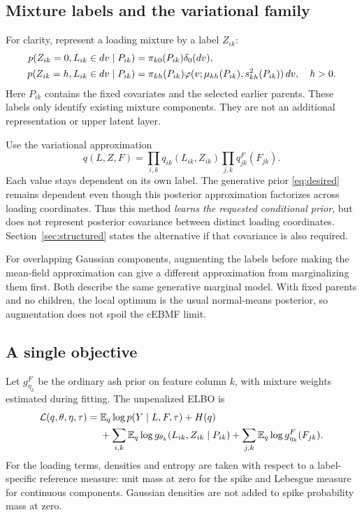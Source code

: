 \documentclass[11pt,a4paper]{article}
\newcommand{\E}{\mathbb E}
\newcommand{\LL}{\mathcal L}
\newcommand{\Normal}[3]{\varphi(#1;#2,#3)}
\begin{document}
\subsection{Mixture labels and the variational family}
For clarity, represent a loading mixture by a label \(Z_{ik}\):
\begin{align}
p(Z_{ik}=0,L_{ik}\in dv\mid P_{ik})
  &=\pi_{k0}(P_{ik})\delta_0(dv),\notag\\
p(Z_{ik}=h,L_{ik}\in dv\mid P_{ik})
  &=\pi_{kh}(P_{ik})\Normal{v}{\mu_{kh}(P_{ik})}{s_{kh}^2(P_{ik})}\,dv,
  \quad h>0.
\label{eq:mixture}
\end{align}
Here \(P_{ik}\) contains the fixed covariates and the selected earlier
parents. These labels only identify existing mixture components. They
are not an additional representation or upper latent layer.

Use the variational approximation
\begin{equation}
q(L,Z,F)=\prod_{i,k}q_{ik}(L_{ik},Z_{ik})\prod_{j,k}q^F_{jk}(F_{jk}).
\label{eq:q}
\end{equation}
Each value stays dependent on its own label. The generative prior
\eqref{eq:desired} remains dependent even though this posterior
approximation factorizes across loading coordinates. Thus this method
\emph{learns the requested conditional prior}, but does not represent
posterior covariance between distinct loading coordinates. Section~\ref{sec:structured}
states the alternative if that covariance is also required.

For overlapping Gaussian components, augmenting the labels before making
the mean-field approximation can give a different approximation from
marginalizing them first. Both describe the same generative marginal model.
With fixed parents and no children, the local optimum is the usual
normal-means posterior, so augmentation does not spoil the cEBMF limit.

\subsection{A single objective}
Let \(g^F_{\eta_k}\) be the ordinary ash prior on feature column \(k\), with
mixture weights estimated during fitting. The unpenalized ELBO is
\begin{align}
\LL(q,\theta,\eta,\tau)
={}&\E_q\log p(Y\mid L,F,\tau)+H(q)\notag\\
 &+\sum_{i,k}\E_q\log g_{\theta_k}(L_{ik},Z_{ik}\mid P_{ik})
 +\sum_{j,k}\E_q\log g^F_{\eta_k}(F_{jk}).
\label{eq:elbo}
\end{align}
For the loading terms, densities and entropy are taken with respect to a
label-specific reference measure: unit mass at zero for the spike and
Lebesgue measure for continuous components. Gaussian densities are not
added to spike probability mass at zero.
\end{document}
